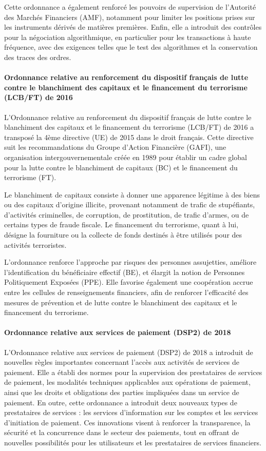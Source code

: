 \documentclass[a4paper, 12pt]{report}
\begin{document}
Cette ordonnance a également renforcé les pouvoirs de supervision de l'Autorité des Marchés Financiers (AMF), notamment pour limiter les positions prises sur les instruments dérivés de matières premières. Enfin, elle a introduit des contrôles pour la négociation algorithmique, en particulier pour les transactions à haute fréquence, avec des exigences telles que le test des algorithmes et la conservation des traces des ordres.

\paragraph{Ordonnance relative au renforcement du dispositif français de lutte contre le blanchiment des capitaux et le financement du terrorisme (LCB/FT) de 2016}

L'Ordonnance relative au renforcement du dispositif français de lutte contre le blanchiment des capitaux et le financement du terrorisme (LCB/FT) de 2016 a transposé la 4ème directive (UE) de 2015 dans le droit français. Cette directive suit les recommandations du Groupe d’Action Financière (GAFI), une organisation intergouvernementale créée en 1989 pour établir un cadre global pour la lutte contre le blanchiment de capitaux (BC) et le financement du terrorisme (FT).

Le blanchiment de capitaux consiste à donner une apparence légitime à des biens ou des capitaux d'origine illicite, provenant notamment de trafic de stupéfiants, d'activités criminelles, de corruption, de prostitution, de trafic d'armes, ou de certains types de fraude fiscale. Le financement du terrorisme, quant à lui, désigne la fourniture ou la collecte de fonds destinés à être utilisés pour des activités terroristes.

L'ordonnance renforce l'approche par risques des personnes assujetties, améliore l'identification du bénéficiaire effectif (BE), et élargit la notion de Personnes Politiquement Exposées (PPE). Elle favorise également une coopération accrue entre les cellules de renseignements financiers, afin de renforcer l'efficacité des mesures de prévention et de lutte contre le blanchiment des capitaux et le financement du terrorisme.

\paragraph{Ordonnance relative aux services de paiement (DSP2) de 2018}

L'Ordonnance relative aux services de paiement (DSP2) de 2018 a introduit de nouvelles règles importantes concernant l’accès aux activités de services de paiement. Elle a établi des normes pour la supervision des prestataires de services de paiement, les modalités techniques applicables aux opérations de paiement, ainsi que les droits et obligations des parties impliquées dans un service de paiement. En outre, cette ordonnance a introduit deux nouveaux types de prestataires de services : les services d’information sur les comptes et les services d’initiation de paiement. Ces innovations visent à renforcer la transparence, la sécurité et la concurrence dans le secteur des paiements, tout en offrant de nouvelles possibilités pour les utilisateurs et les prestataires de services financiers.
\end{document}
